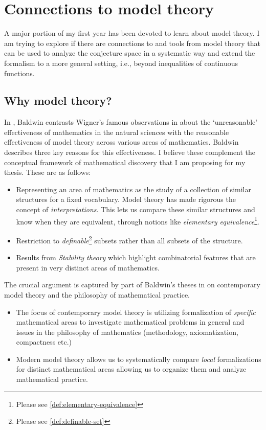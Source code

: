 \section{Connections to model theory}
A major portion of my first year has been devoted to learn about model theory. I am trying to explore if there are connections to and tools from model theory that can be used to analyze the conjecture space in a systematic way and extend the formalism to a more general setting, i.e., beyond inequalities of continuous functions.
\subsection{Why model theory?}
In \cite{baldwin2020reasonable}, Baldwin contrasts Wigner's famous observations in \cite{wigner1990unreasonable} about the `unreasonable' effectiveness of mathematics in the natural sciences with the reasonable effectiveness of model theory across various areas of mathematics. Baldwin describes three key reasons for this effectiveness.
I believe these complement the conceptual framework of mathematical discovery that I am proposing for my thesis. These are as follows:
\begin{itemize}
    \item Representing an area of mathematics as the study of a collection of similar structures for a fixed vocabulary. Model theory has made rigorous the concept of \textit{interpretations}. This lets us compare these similar structures and know when they are equivalent, through notions like \textit{elementary equivalence}\footnote[1]{Please see \ref{def:elementary-equivalence}}.
    \item Restriction to \textit{definable}\footnote[2]{Please see \ref{def:definable-set}} subsets rather than all subsets of the structure.
    \item Results from \textit{Stability theory} which highlight combinatorial features that are present in very distinct areas of mathematics. 
\end{itemize} 

The crucial argument is captured by part of Baldwin's theses in \cite{Baldwin_2018} on contemporary model theory and the philosophy of mathematical practice.
\begin{itemize}
    \item The focus of contemporary model theory is utilizing formalization of \textit{specific} mathematical areas to investigate mathematical problems in general and issues in the philosophy of mathematics (methodology, axiomatization, compactness etc.)
    \item Modern model theory allows us to systematically compare \textit{local} formalizations for distinct mathematical areas allowing us to organize them and analyze mathematical practice.
\end{itemize}

